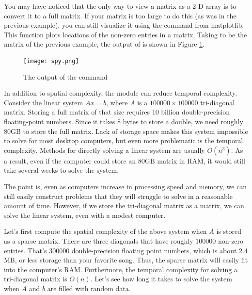 You may have noticed that the only way to view a matrix as a 2-D array is to convert it to a full matrix. If your matrix is too large to do this (as was  in the previous example),
you can still visualize it using the  command from matplotlib. This function plots
locations of the non-zero entries in a matrix.
Taking  to be the matrix of the previous example, the output of  is shown in Figure \ref{fig:mpl_spy}.

\begin{figure}[ht]
\centering
\texttt{[image: spy.png]}
\caption{The output of the  command}
\label{fig:mpl_spy}
\end{figure}




In addition to spatial complexity, the  module can reduce temporal complexity. Consider the linear system $A x = b$, where $A$ is a $100000\times 100000$ tri-diagonal matrix.
Storing a full matrix of that size requires 10 billion double-precision floating-point numbers.  Since it takes 8 bytes to store a double, we need roughly 80GB to store the full matrix.  Lack of storage space makes this system impossible to solve for most desktop computers, but even more problematic is the temporal complexity.
Methods for directly solving a linear system are usually $O(n^3)$. As a result, even if the computer could store an 80GB matrix in RAM, it would still take several weeks to solve the system. 

The point is, even as computers increase in processing speed and memory, we can still easily construct problems that they will struggle to solve in a reasonable amount of time. However, if we store the tri-diagonal matrix as a  matrix, we can solve the linear system, even with a modest computer.  

Let's first compute the spatial complexity of the above system when $A$ is stored as a sparse matrix.  There are three diagonals that have roughly $100000$ non-zero entries.  That's $300000$
double-precision floating point numbers, which is about 2.4 MB, or less storage than your favorite song.  Thus, the sparse matrix will easily fit into the computer's RAM.  Furthermore, the temporal complexity for solving a tri-diagonal matrix is $O(n)$. Let's see how long it takes to solve the system when $A$ and $b$ are filled with random data.

